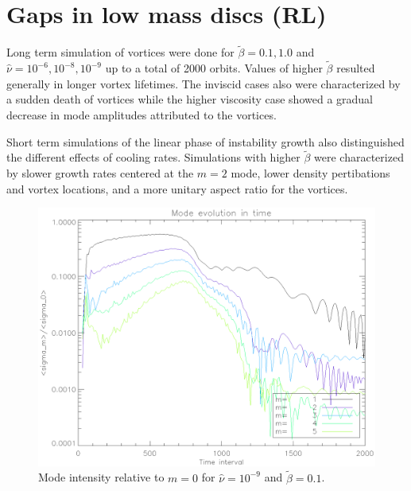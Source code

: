 \section{Gaps in low mass discs (RL)}



Long term simulation of vortices were done for $\tilde{\beta}=0.1,1.0$ and
 $\hat{\nu}=10^{-6},10^{-8},10^{-9}$ up to a total of 2000 orbits. Values
 of higher $\tilde{\beta}$ resulted generally in longer vortex lifetimes.
 The inviscid cases also were characterized by a sudden death of vortices
 while the higher viscosity case showed a gradual decrease in mode amplitudes
 attributed to the vortices.

Short term simulations of the linear phase of instability growth also distinguished
 the different effects of cooling rates. Simulations with higher
 $\tilde{\beta}$ were characterized by slower growth rates centered at the
 $m=2$ mode, lower density pertibations and vortex locations, and a more unitary aspect
 ratio for the vortices.

 \begin{figure}
   \includegraphics[scale=.42]{figures/stability_vis9betalow.ps}
   \caption{Mode intensity relative to $m=0$ for $\hat{\nu}=10^{-9}$ and $\tilde{\beta}=0.1$.}
 \label{stability_vis9lowb}
 \end{figure}


